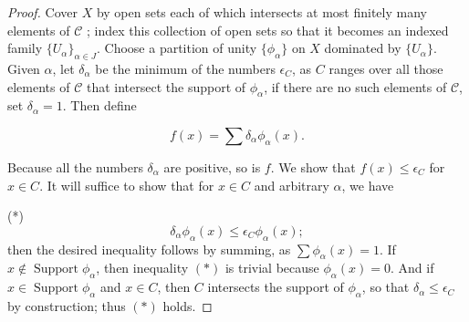 \begin{proof}
Cover \(X\) by open sets each of which intersects at most finitely many elements of \(\mathcal{C}\) ; index this collection of open sets so that it becomes an indexed family \({\{ U_{\alpha }\} }_{\alpha \in J}\). Choose a partition of unity \(\{ {\phi }_{\alpha }\}\) on \(X\) dominated by \(\{ U_{\alpha }\}\). Given \(\alpha\), let \({\delta }_{\alpha }\) be the minimum of the numbers \({\epsilon }_{C}\), as \(C\) ranges over all those elements of \(\mathcal{C}\) that intersect the support of \({\phi }_{\alpha }\), if there are no such elements of \(\mathcal{C}\), set \({\delta }_{\alpha } = 1\). Then define

\[
f(x) = \sum {\delta }_{\alpha }{\phi }_{\alpha }(x).
\]

Because all the numbers \({\delta }_{\alpha }\) are positive, so is \(f\). We show that \(f(x) \leq {\epsilon }_{C}\) for \(x \in C\). It will suffice to show that for \(x \in C\) and arbitrary \(\alpha\), we have

(*)
\[
{\delta }_{\alpha }{\phi }_{\alpha }(x) \leq {\epsilon }_{C}{\phi }_{\alpha }(x) ;
\]
then the desired inequality follows by summing, as \(\sum {\phi }_{\alpha }(x) = 1\). If \(x \notin \operatorname{Support}{\phi }_{\alpha }\), then inequality \(( *)\) is trivial because \({\phi }_{\alpha }(x) = 0\). And if \(x \in \operatorname{Support}{\phi }_{\alpha }\) and \(x \in C\), then \(C\) intersects the support of \({\phi }_{\alpha }\), so that \({\delta }_{\alpha } \leq {\epsilon }_{C}\) by construction; thus \(( *)\) holds.
\end{proof}
